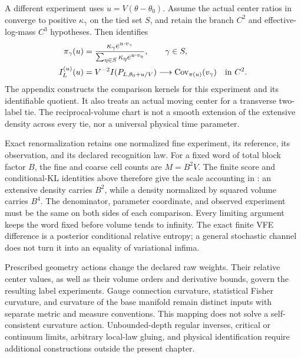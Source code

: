 A different experiment uses $u=V(\theta-\theta_0)$. Assume the actual
center ratios in  converge to
positive $\kappa_\gamma$ on the tied set $S$, and retain the branch
$C^2$ and effective-log-mass $C^3$ hypotheses. Then
 identifies
\begin{align}
 \pi_\gamma(u)
 &=\frac{\kappa_\gamma e^{u\cdot v_\gamma}}
         {\sum_{\eta\in S}\kappa_\eta e^{u\cdot v_\eta}},
 \qquad \gamma\in S,
 \label{eq:rg-thermo-draft-window-weights}\\
 I_L^{(u)}(u)
 &=V^{-2}I(P_{L,\theta_0+u/V})
 \longrightarrow\operatorname{Cov}_{\pi(u)}(v_\gamma)
 \quad\hbox{in }C^2.
 \label{eq:rg-thermo-draft-window-metric}
\end{align}
The appendix constructs the comparison kernels for this experiment and
its identifiable quotient. It also treats an actual moving center for a
transverse two-label tie. The reciprocal-volume chart is not a smooth
extension of the extensive density across every tie, nor a universal
physical time parameter.\thermoestablishedstatus

Exact renormalization retains one normalized fine experiment, its
reference, its observation, and its declared recognition law. For a
fixed word of total block factor $B$, the fine and coarse cell counts
are $M=B^2V$. The finite score and conditional-KL identities above
therefore give the scale accounting in
: an extensive density carries
$B^2$, while a density normalized by squared volume carries $B^4$.
The denominator, parameter coordinate, and observed experiment must be
the same on both sides of each comparison. Every limiting argument
keeps the word fixed before volume tends to infinity. The exact finite
VFE difference is a posterior conditional relative entropy; a general
stochastic channel does not turn it into an equality of variational
infima.\thermoestablishedstatus

Prescribed geometry actions change the declared raw weights. Their
relative center values, as well as their volume orders and derivative
bounds, govern the resulting label experiments. Gauge connection
curvature, statistical Fisher curvature, and curvature of the base
manifold remain distinct inputs with separate metric and measure
conventions. This mapping does not solve a self-consistent curvature
action. Unbounded-depth regular inverses, critical or continuum limits,
arbitrary local-law gluing, and physical identification require
additional constructions outside the present chapter.\thermoestablishedstatus
\endgroup
